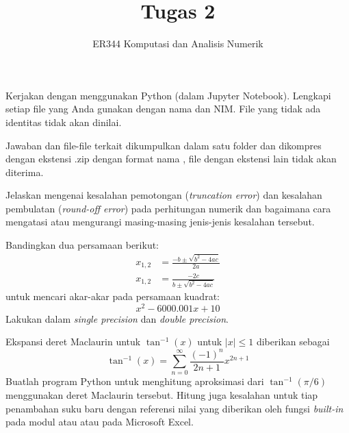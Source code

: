



\title{Tugas 2}
\author{ER344 Komputasi dan Analisis Numerik}
\date{}
\maketitle

Kerjakan dengan menggunakan Python (dalam Jupyter Notebook).
Lengkapi setiap file 
yang Anda gunakan dengan nama dan NIM.
File yang tidak ada identitas tidak akan dinilai.


Jawaban dan file-file terkait dikumpulkan dalam satu folder dan
dikompres dengan ekstensi .zip dengan
format nama  , file dengan ekstensi lain tidak
akan diterima.


\begin{soal}
Jelaskan mengenai kesalahan pemotongan (\textit{truncation error})
dan kesalahan pembulatan (\textit{round-off error}) pada perhitungan numerik
dan bagaimana cara mengatasi atau mengurangi masing-masing jenis-jenis
kesalahan tersebut.
\end{soal}


\begin{soal}
Bandingkan dua persamaan berikut:
\begin{align*}
x_{1,2} & = \frac{-b \pm \sqrt{b^2 - 4ac}}{2a} \\
x_{1,2} & = \frac{-2c}{b \pm \sqrt{b^2 - 4ac}}
\end{align*}
untuk mencari akar-akar pada persamaan kuadrat:
\begin{equation*}
x^2 - 6000.001x + 10
\end{equation*}
Lakukan dalam \textit{single precision} dan \textit{double precision}.
\end{soal}


\begin{soal}
Ekspansi deret Maclaurin untuk $\tan^{-1}(x)$ untuk $|x| \leq 1$ diberikan sebagai
\begin{equation*}
\tan^{-1}(x) = \sum_{n=0}^{\infty} \frac{(-1)^{n}}{2n + 1} x^{2n + 1}
\end{equation*}
Buatlah program Python untuk menghitung aproksimasi dari $\tan^{-1}(\pi/6)$ menggunakan deret
Maclaurin tersebut. Hitung juga kesalahan untuk tiap penambahan suku baru dengan referensi
nilai yang diberikan oleh fungsi \textit{built-in} pada modul  atau
 atau pada Microsoft Excel.
\end{soal}

